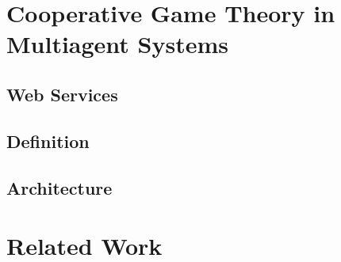    \section{Cooperative Game Theory in Multiagent Systems}\label{sec:CGTMS}
    
        \subsection{Web Services}\label{sec:BRWS}

        \subsection{Definition}\label{sec:CWSDefinition}

        \subsection{Architecture}\label{sec:CWSArchitecture}
    

    \section{Related Work}\label{sec:BRRelatedWork}



